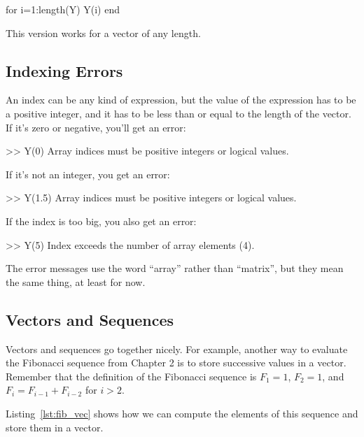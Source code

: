 \begin{code}
for i=1:length(Y)
     Y(i)
end
\end{code}

This version works for a vector of any length.


\subsection{Indexing Errors}


An index can be any kind of expression, but the value of the
expression has to be a positive integer, and it has to be
less than or equal to the length of the vector.  If it's
zero or negative, you'll get an error:

\begin{code}
>> Y(0)
Array indices must be positive integers or logical values.
\end{code}

If it's not an integer, you get an error:

\begin{code}
>> Y(1.5)
Array indices must be positive integers or logical values.
\end{code}

If the index is too big, you also get an error:

\begin{code}
>> Y(5)
Index exceeds the number of array elements (4).
\end{code}

The error messages use the word ``array'' rather than ``matrix'', 
but they mean the same thing, at least for now.


\subsection{Vectors and Sequences}
\label{vecseq}


Vectors and sequences go together nicely.
For example, another way to evaluate the Fibonacci sequence from Chapter 2 is to
store successive values in a vector.  Remember that the definition of the
Fibonacci sequence is $F_1 = 1$, $F_2 = 1$, and
$F_{i} = F_{i-1} + F_{i-2}$ for $i > 2$.

Listing~\ref{lst:fib_vec} shows how we can compute the elements of this sequence and store them in a vector.

